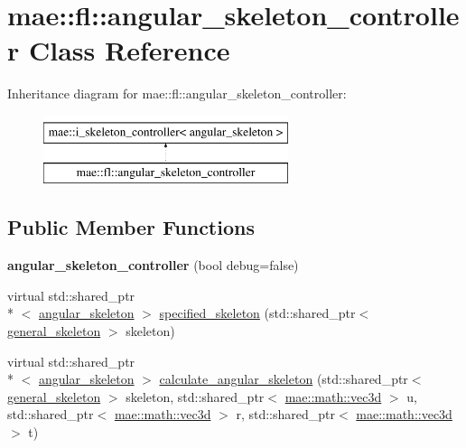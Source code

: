 \hypertarget{classmae_1_1fl_1_1angular__skeleton__controller}{\section{mae\-:\-:fl\-:\-:angular\-\_\-skeleton\-\_\-controller Class Reference}
\label{classmae_1_1fl_1_1angular__skeleton__controller}
}
Inheritance diagram for mae\-:\-:fl\-:\-:angular\-\_\-skeleton\-\_\-controller\-:\begin{figure}[H]
\begin{center}
\leavevmode
\includegraphics[height=2.000000cm]{classmae_1_1fl_1_1angular__skeleton__controller}
\end{center}
\end{figure}
\subsection*{Public Member Functions}
\begin{DoxyCompactItemize}
\item 
\hypertarget{classmae_1_1fl_1_1angular__skeleton__controller_a83357968cdb490b9032a32e9fef2765a}{{\bfseries angular\-\_\-skeleton\-\_\-controller} (bool debug=false)}\label{classmae_1_1fl_1_1angular__skeleton__controller_a83357968cdb490b9032a32e9fef2765a}

\item 
virtual std\-::shared\-\_\-ptr\\*
$<$ \hyperlink{classmae_1_1fl_1_1angular__skeleton}{angular\-\_\-skeleton} $>$ \hyperlink{classmae_1_1fl_1_1angular__skeleton__controller_afae922566ff1d48db88538bd4b0c0d19}{specified\-\_\-skeleton} (std\-::shared\-\_\-ptr$<$ \hyperlink{classmae_1_1general__skeleton}{general\-\_\-skeleton} $>$ skeleton)
\item 
virtual std\-::shared\-\_\-ptr\\*
$<$ \hyperlink{classmae_1_1fl_1_1angular__skeleton}{angular\-\_\-skeleton} $>$ \hyperlink{classmae_1_1fl_1_1angular__skeleton__controller_a51516cf6b196485b86505bc4ff70959e}{calculate\-\_\-angular\-\_\-skeleton} (std\-::shared\-\_\-ptr$<$ \hyperlink{classmae_1_1general__skeleton}{general\-\_\-skeleton} $>$ skeleton, std\-::shared\-\_\-ptr$<$ \hyperlink{classmae_1_1math_1_1vec3d}{mae\-::math\-::vec3d} $>$ u, std\-::shared\-\_\-ptr$<$ \hyperlink{classmae_1_1math_1_1vec3d}{mae\-::math\-::vec3d} $>$ r, std\-::shared\-\_\-ptr$<$ \hyperlink{classmae_1_1math_1_1vec3d}{mae\-::math\-::vec3d} $>$ t)
\end{DoxyCompactItemize}
